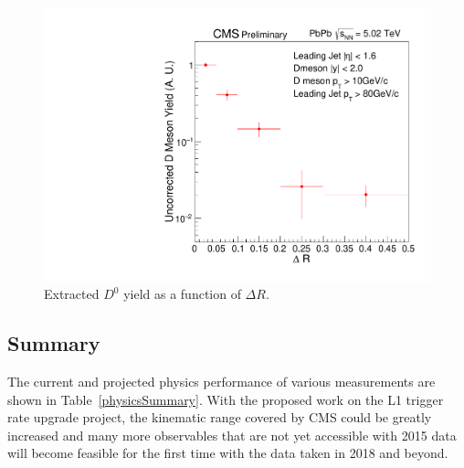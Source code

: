 \begin{figure}[!ht]
\begin{center}
\includegraphics[width=.49\textwidth]{DJetPlots/PrelimYield.pdf}
\caption{Extracted $D^0$ yield as a function of $\Delta R$.}
\label{fig:D0_JetYield}
\end{center}
\end{figure}


\subsection{Summary}

The current and projected physics performance of various measurements are shown in Table~\ref{physicsSummary}. With the proposed work on the L1 trigger rate upgrade project, the kinematic range covered by CMS could be greatly increased and many more observables that are not yet accessible with 2015 data will become feasible for the first time with the data taken in 2018 and beyond.

